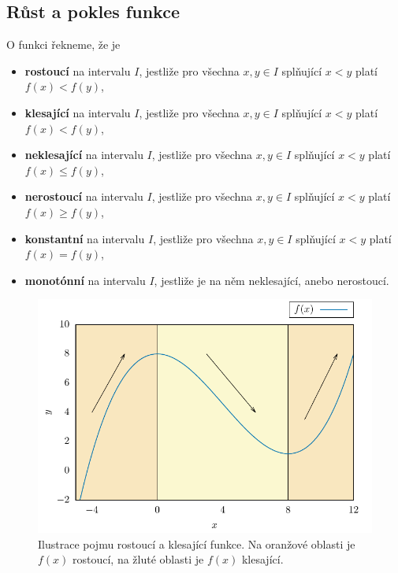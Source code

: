 \subsection{Růst a pokles funkce}
O funkci řekneme, že je \begin{itemize}
    \item \textbf{rostoucí} na intervalu $I$, jestliže pro všechna $x,y \in I$ splňující $x<y$ platí $f(x) < f(y)$,
    \item \textbf{klesající} na intervalu $I$, jestliže pro všechna $x,y \in I$ splňující $x<y$ platí $f(x) < f(y)$,
    \item \textbf{neklesající} na intervalu $I$, jestliže pro všechna $x,y \in I$ splňující $x<y$ platí $f(x) \leq f(y)$,
    \item \textbf{nerostoucí} na intervalu $I$, jestliže pro všechna $x,y \in I$ splňující $x<y$ platí $f(x) \geq f(y)$,
    \item \textbf{konstantní} na intervalu $I$, jestliže pro všechna $x,y \in I$ splňující $x<y$ platí $f(x) = f(y)$,
    \item \textbf{monotónní} na intervalu $I$, jestliže je na něm neklesající, anebo nerostoucí.
\end{itemize}

\begin{figure}[H]
    \centering
    \includegraphics[scale = 0.7]{Gnuplot/Figures/funkce-rostouci-klesajici-obr.pdf}
    \caption{Ilustrace pojmu rostoucí a klesající funkce. Na oranžové oblasti je $f(x)$ rostoucí, na žluté oblasti je $f(x)$ klesající.}
\end{figure}


